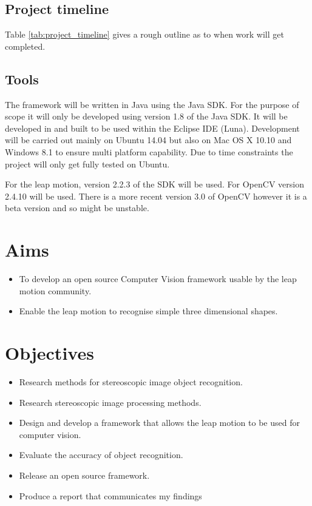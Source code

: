 \documentclass[11pt,oneside]{report}
\begin{document}
					\subsection{Project timeline}
					Table \ref{tab:project_timeline} gives a rough outline as to when work will get completed.
					
			\subsection{Tools}
			The framework will be written in Java using the Java SDK.
			For the purpose of scope it will only be developed using version 1.8 of the Java SDK.
			It will be developed in and built to be used within the Eclipse IDE (Luna).
			Development will be carried out mainly on Ubuntu 14.04 but also on Mac OS X 10.10 and Windows 8.1 to ensure multi platform capability.
			Due to time constraints the project will only get fully tested on Ubuntu.
			
			For the leap motion, version 2.2.3 of the SDK will be used.
			For OpenCV version 2.4.10 will be used.
			There is a more recent version 3.0 of OpenCV however it is a beta version and so might be unstable.
		\section{Aims} 
		\begin{itemize}
			\item To develop an open source Computer Vision framework usable by the leap motion community.
			\item Enable the leap motion to recognise simple three dimensional shapes.
		\end{itemize}
		\section{Objectives} 
		\begin{itemize}
			\item Research methods for stereoscopic image object recognition.
			\item Research stereoscopic image processing methods.
			\item Design and develop a framework that allows the leap motion to be used for computer vision.
			\item Evaluate the accuracy of object recognition.
			\item Release an open source framework.
			\item Produce a report that communicates my findings
		\end{itemize}
		
\end{document}
